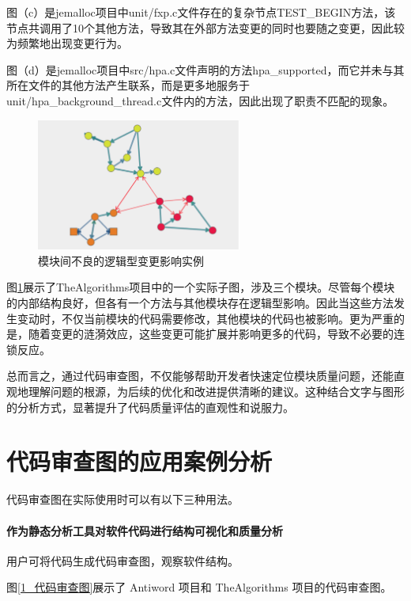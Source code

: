 图（c）是jemalloc项目中unit/fxp.c文件存在的复杂节点TEST\_BEGIN方法，该节点共调用了10个其他方法，导致其在外部方法变更的同时也要随之变更，因此较为频繁地出现变更行为。

图（d）是jemalloc项目中src/hpa.c文件声明的方法hpa\_supported，而它并未与其所在文件的其他方法产生联系，而是更多地服务于unit/hpa\_background\_thread.c文件内的方法，因此出现了职责不匹配的现象。

\begin{figure}[h]
\centering
\includegraphics[width = 0.6\textwidth]{figures/不良变更影响.png}
\caption{模块间不良的逻辑型变更影响实例}
\label{1_不良的逻辑型变更影响实例}
\end{figure}


图\ref{1_不良的逻辑型变更影响实例}展示了TheAlgorithms项目中的一个实际子图，涉及三个模块。尽管每个模块的内部结构良好，但各有一个方法与其他模块存在逻辑型影响。因此当这些方法发生变动时，不仅当前模块的代码需要修改，其他模块的代码也被影响。更为严重的是，随着变更的涟漪效应，这些变更可能扩展并影响更多的代码，导致不必要的连锁反应。

总而言之，通过代码审查图，不仅能够帮助开发者快速定位模块质量问题，还能直观地理解问题的根源，为后续的优化和改进提供清晰的建议。这种结合文字与图形的分析方式，显著提升了代码质量评估的直观性和说服力。


\section{代码审查图的应用案例分析}

代码审查图在实际使用时可以有以下三种用法。

\paragraph{作为静态分析工具对软件代码进行结构可视化和质量分析} 用户可将代码生成代码审查图，观察软件结构。

图\ref{1_代码审查图}展示了 Antiword 项目和 TheAlgorithms 项目的代码审查图。

